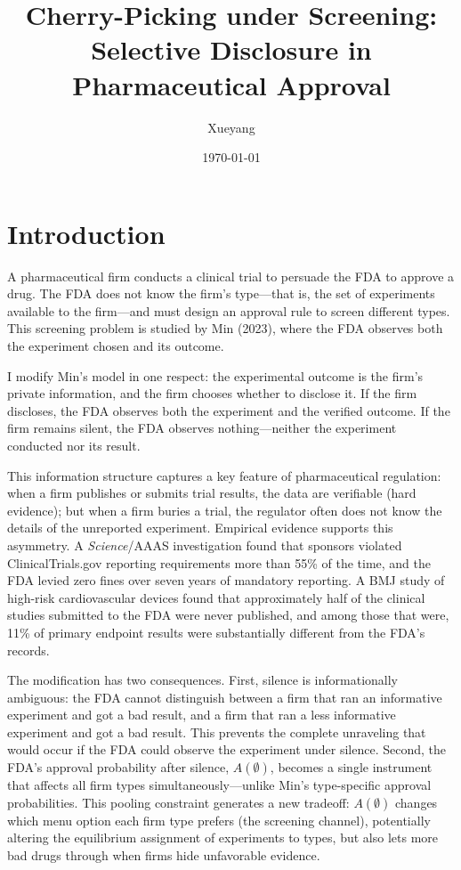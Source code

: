 \documentclass[12pt,a4paper]{article}
\title{Cherry-Picking under Screening:\\ Selective Disclosure in Pharmaceutical Approval}
\author{Xueyang}
\date{\today}
\begin{document}
\maketitle

\section{Introduction}

A pharmaceutical firm conducts a clinical trial to persuade the
FDA to approve a drug. The FDA does not know the firm's
type---that is, the set of experiments available to the
firm---and must design an approval rule to screen different
types. This screening problem is studied by Min (2023), where
the FDA observes both the experiment chosen and its outcome.

I modify Min's model in one respect: the experimental outcome
is the firm's private information, and the firm chooses whether
to disclose it. If the firm discloses, the FDA observes both
the experiment and the verified outcome. If the firm remains
silent, the FDA observes nothing---neither the experiment
conducted nor its result.

This information structure captures a key feature of
pharmaceutical regulation: when a firm publishes or submits
trial results, the data are verifiable (hard evidence); but
when a firm buries a trial, the regulator often does not know
the details of the unreported experiment. Empirical evidence
supports this asymmetry. A \emph{Science}/AAAS investigation
found that sponsors violated ClinicalTrials.gov reporting
requirements more than 55\% of the time, and the FDA levied
zero fines over seven years of mandatory reporting. A BMJ study
of high-risk cardiovascular devices found that approximately
half of the clinical studies submitted to the FDA were never
published, and among those that were, 11\% of primary endpoint
results were substantially different from the FDA's records.

The modification has two consequences. First, silence is
informationally ambiguous: the FDA cannot distinguish between a
firm that ran an informative experiment and got a bad result, and
a firm that ran a less informative experiment and got a bad
result. This prevents the complete unraveling that would occur
if the FDA could observe the experiment under silence. Second,
the FDA's approval probability after silence, $A(\emptyset)$,
becomes a single instrument that affects all firm types
simultaneously---unlike Min's type-specific approval
probabilities. This pooling constraint generates a new
tradeoff: $A(\emptyset)$ changes which menu option each firm
type prefers (the screening channel), potentially altering the
equilibrium assignment of experiments to types, but also lets
more bad drugs through when firms hide unfavorable evidence.
\end{document}
